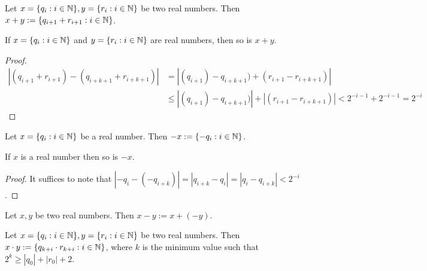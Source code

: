 \documentclass[../main.tex]{memoir}
\begin{document}
\begin{definition}
  Let $x = \{q_i: i \in \mathbb{N}\}, y = \{r_i: i \in \mathbb{N}\}$ be two real numbers. Then $x + y := \{q_{i + 1} + r_{i + 1}: i \in \mathbb{N}\}$.
\end{definition}

\begin{theorem}
  If $x = \{q_i: i \in \mathbb{N}\}$ and $y = \{r_i: i \in \mathbb{N}\}$ are real numbers, then so is $x + y$.
\end{theorem}
\begin{proof}
  \begin{align*}
    |(q_{i + 1} + r_{i + 1}) - (q_{i + k + 1} + r_{i + k + 1})|
    & = |(q_{i + 1}) - q_{i + k + 1}) + (r_{i + 1} - r_{i + k + 1})| \\
    & \le |(q_{i + 1}) - q_{i + k + 1})| + |(r_{i + 1} - r_{i + k + 1})| < 2^{-i - 1} + 2^{-i - 1} = 2^{-i}
  \end{align*}
\end{proof}

\begin{definition}
  Let $x = \{q_i: i \in \mathbb{N}\}$ be a real number. Then $-x := \{-q_i: i \in \mathbb{N}\}$.
\end{definition}

\begin{theorem}
  If $x$ is a real number then so is $-x$.
\end{theorem}
\begin{proof}
  It suffices to note that $|-q_i - (-q_{i + k})| = |q_{i + k} - q_i| = |q_i - q_{i + k}| < 2^{-i}$.
\end{proof}

\begin{definition}
  Let $x, y$ be two real numbers. Then $x - y := x + (-y)$.
\end{definition}

\begin{definition}
  Let $x = \{q_i: i \in \mathbb{N}\}, y = \{r_i: i \in \mathbb{N}\}$ be two real numbers. Then $x \cdot y := \{q_{k + i} \cdot r_{k + i}: i \in \mathbb{N}\}$, where $k$ is the minimum value such that $2^k \ge |q_0| + |r_0| + 2$.
\end{definition}
\end{document}

